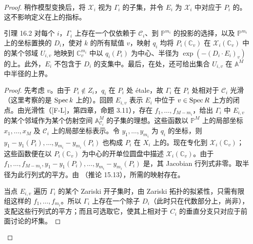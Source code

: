 \begin{proof}
稍作模型变换后，将 $\mathscr X_i$ 视为 $\Gamma_i$ 的子集，并令 $E_i$ 为 $\mathscr X_i$ 中对应于 $P_i$ 的。这不影响定义在上的指标。
\begin{statement}{引理 16.2}
对每个 $i$，$\Gamma_i$ 上存在一个仅依赖于 $\mathscr C_i$、到 $\mathbb P^{m_i}$ 的投影的选择，以及 $\mathbb P^{m_i}$ 上的坐标置换的 $D_i$，使对 $k$ 的所有赋值 $v$，映射 $q_i$ 均将 $P_i(\mathbb C_v)$ 在 $\mathscr X_i(\mathbb C_v)$ 中的某个邻域 $U_{i,v}$ 地映到 $\mathbb C_v^{m_i}$ 中以 $q_i(P_i)$ 为中心、半径为 $\exp(-(D_i\cdot E_i)_v)$ 的上。此外，$E_i$ 不包含于 $D_i$ 的支集中。最后，在处，还可给出集合 $U_{i,v}$ 在 $\mathbb A^M$ 中半径的上界。
\end{statement}
\begin{proof}
先考虑 $v$。由于 $P_i\notin Z_i$，$q_i$ 在 $P_i$ 处 étale，故 $\Gamma_i$ 在 $P_i$ 处相对于 $\mathscr C_i$ 光滑（这里考察的是 $\operatorname{Spec} k$ 上的）。回顾 $E_{i,v}$ 表示 $E_i$ 中位于 $v\in\operatorname{Spec} R$ 上方的闭点。由光滑性（[F-L]，第四章，命题 3.11），存在 $f_1,\ldots,f_{M-m_i}$，给出 $\Gamma_i$ 中 $E_{i,v}$ 的某个邻域作为某个仿射空间 $\mathbb A^M_{\mathscr C_i}$ 的子集的理想。这些函数以 $\mathbb P^M$ 上的局部坐标 $x_1,\ldots,x_M$ 及 $\mathscr C_i$ 上的局部坐标表示。令 $y_1,\ldots,y_{m_i}$ 为 $q_i$ 的坐标，则 $y_1-y_1(P_i),\ldots,y_{m_i}-y_{m_i}(P_i)$ 也构成 $P_i$ 在 $X_i$ 上的。现在专化到 $\mathscr X_i(\mathbb C_v)$；这些函数便在以 $P_i(\mathbb C_v)$ 为中心的开单位圆盘中描述 $\mathscr X_i(\mathbb C_v)$。由于
$f_1,\ldots,f_{M-m_i},y_1-y_1(P_i),\ldots,y_{m_i}-y_{m_i}(P_i)$ 是，其 Jacobian 行列式非零。取半径为此行列式的平方。由 （推论 15.13），所需的映射存在。

当点 $E_{i,v}$ 遍历 $\Gamma_i$ 的某个 Zariski 开子集时，由 Zariski 拓扑的拟紧性，只需有限组这样的 $f_1,\ldots,f_{m_i}$。所以 $\Gamma_i$ 上存在一个除子 $D_i$（此时只在代数部分上，尚非），支配这些行列式的平方；而且可选取它，使其上相对于 $C_i$ 的垂直分支只对应于前面讨论的坏集。


\end{proof}
\end{proof}
